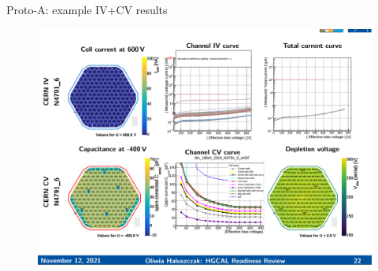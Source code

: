 \documentclass{beamer}
\begin{document}
\begin{frame}{Proto-A: example IV+CV results}
    \begin{figure}
  \includegraphics[width=.8\textwidth]{plots/IV_CV_example.png}
        
    \end{figure}
\end{frame}
\end{document}
